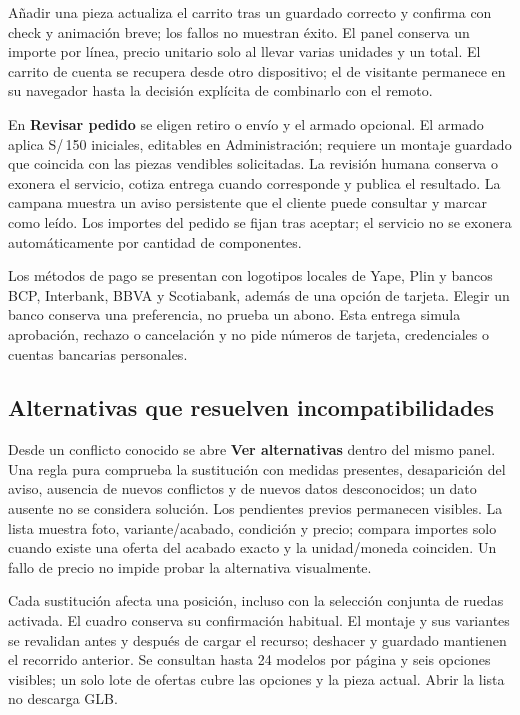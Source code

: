 \documentclass[12pt,letterpaper]{article}
\begin{document}
Añadir una pieza actualiza el carrito tras un guardado correcto y confirma con check y animación breve; los fallos no muestran éxito. El panel conserva un importe por línea, precio unitario solo al llevar varias unidades y un total. El carrito de cuenta se recupera desde otro dispositivo; el de visitante permanece en su navegador hasta la decisión explícita de combinarlo con el remoto.

En \textbf{Revisar pedido} se eligen retiro o envío y el armado opcional. El armado aplica S/\,150 iniciales, editables en Administración; requiere un montaje guardado que coincida con las piezas vendibles solicitadas. La revisión humana conserva o exonera el servicio, cotiza entrega cuando corresponde y publica el resultado. La campana muestra un aviso persistente que el cliente puede consultar y marcar como leído. Los importes del pedido se fijan tras aceptar; el servicio no se exonera automáticamente por cantidad de componentes.

Los métodos de pago se presentan con logotipos locales de Yape, Plin y bancos BCP, Interbank, BBVA y Scotiabank, además de una opción de tarjeta. Elegir un banco conserva una preferencia, no prueba un abono. Esta entrega simula aprobación, rechazo o cancelación y no pide números de tarjeta, credenciales o cuentas bancarias personales.

\subsection{Alternativas que resuelven incompatibilidades}
Desde un conflicto conocido se abre \textbf{Ver alternativas} dentro del mismo panel. Una regla pura comprueba la sustitución con medidas presentes, desaparición del aviso, ausencia de nuevos conflictos y de nuevos datos desconocidos; un dato ausente no se considera solución. Los pendientes previos permanecen visibles. La lista muestra foto, variante/acabado, condición y precio; compara importes solo cuando existe una oferta del acabado exacto y la unidad/moneda coinciden. Un fallo de precio no impide probar la alternativa visualmente.

Cada sustitución afecta una posición, incluso con la selección conjunta de ruedas activada. El cuadro conserva su confirmación habitual. El montaje y sus variantes se revalidan antes y después de cargar el recurso; deshacer y guardado mantienen el recorrido anterior. Se consultan hasta 24 modelos por página y seis opciones visibles; un solo lote de ofertas cubre las opciones y la pieza actual. Abrir la lista no descarga GLB.
\end{document}
